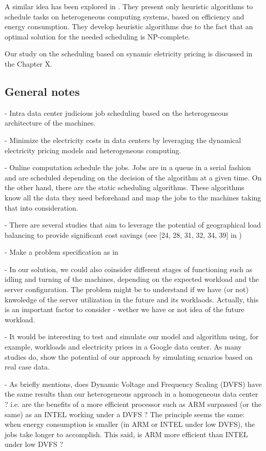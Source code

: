 A similar idea has been explored in \cite{EXE_METHOD}. They present only
heuristic algorithms to schedule tasks on heterogeneous computing systems,
based on efficiency and energy consumption. They develop heuristic algorithms
due to the fact that an optimal solution for the needed scheduling is
NP-complete.  

Our study on the scheduling based on synamic eletricity pricing is discussed in the Chapter X.


\subsection{General notes}

- Intra data center judicious job scheduling based on the heterogeneous
  architecture of the machines.

- Minimize the electricity costs in data centers by leveraging the dynamical 
  electricity pricing models and heterogeneous computing.

 - Online computation schedule the jobs. Jobs are in a queue in a serial fashion
  and are scheduled depending on the decision of the algorithm at a given time.
  On the other hand, there are the static scheduling algorithms. These
  algorithms know all the data they need beforehand and map the jobs to the
  machines taking that into consideration.

- There are several studies that aim to leverage the potential of geographical 
  load balancing to provide significant cost savings (see [24, 28, 31, 32, 34,
  39] in \cite{GREENING})

- Make a problem specification as in \cite{CUTTING_BILL}

- In our solution, we could also coinsider different stages of functioning such
  as idling and turning of the machines, depending on the expected workload and
  the server configuration. The problem might be to understand if we have (or
  not) knwoledge of the server utilization in the future and its worklaods.
  Actually, this is an important factor to consider - wether we have or not idea
  of the future workload.  

- It would be interesting to test and simulate our model and algorithm using,
  for example, workloads and electricity prices in a Google data center. As many
  studies do, show the potential of our approach by simulating scnarios based on
  real case data. 

- As \cite{DYN_PRICING_HPC} briefly mentions, does  Dynamic Voltage and Frequency 
  Scaling (DVFS) have the same results than our heterogeneous approach in a
  homogeneous data center ? i.e. are the benefits of a more efficient processor
  such as ARM surpassed (or the same) as an INTEL working under a DVFS ? The
  principle seems the same: when energy consumption is smaller (in ARM or INTEL
  under low DVFS), the jobs take longer to accomplish. This said, is ARM more
  efficient than INTEL under low DVFS ?   

